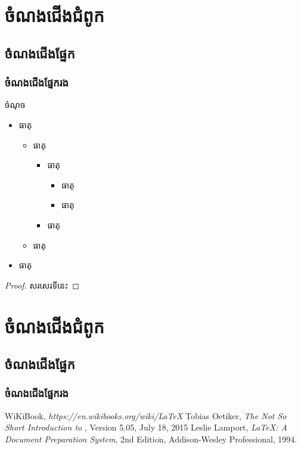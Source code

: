 \documentclass[12pt,a4paper]{book}
\begin{document}
\chapter{ចំណងជើងជំពូក}
\section{ចំណងជើងផ្នែក}
\subsection{ចំណងជើងផ្នែករង}
	\begin{thm}
		ចំណុច
		\begin{itemize}
			\item ធាតុ
			\begin{itemize}
				\item ធាតុ
				\begin{itemize}
					\item ធាតុ
					\begin{itemize}
						\item ធាតុ
						\item ធាតុ
					\end{itemize}
					\item ធាតុ
				\end{itemize}
				\item ធាតុ
			\end{itemize}
			\item ធាតុ
		\end{itemize}
	\end{thm}
	\begin{proof}
		សរសេរទីនេះ
	\end{proof}
\appendix
\chapter{ចំណងជើងជំពូក}
\section{ចំណងជើងផ្នែក}
\subsection{ចំណងជើងផ្នែករង}
\backmatter
\begin{thebibliography}{3}
	 WiKiBook, \emph{https://en.wikibooks.org/wiki/LaTeX}
	 Tobias Oetiker, \emph{The Not So Short Introduction to \LaTeXe}, Version 5.05, July 18, 2015
	 Leslie Lamport, \emph{\LaTeX: A Document Preparation System}, 2nd Edition, Addison-Wesley Professional, 1994.
\end{thebibliography}
\end{document}
